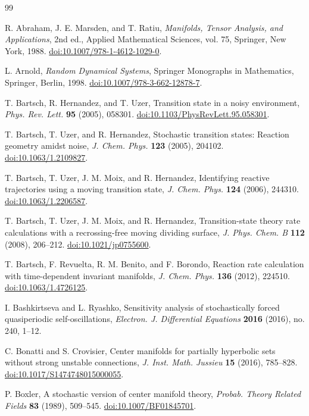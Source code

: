 \documentclass[11pt]{article}
\theoremstyle{definition}
\theoremstyle{remark}
\newcommand{\doi}[1]{\href{https://doi.org/#1}{doi:#1}}
\begin{document}
\begin{thebibliography}{99}

R. Abraham, J. E. Marsden, and T. Ratiu,
\emph{Manifolds, Tensor Analysis, and Applications},
2nd ed., Applied Mathematical Sciences, vol. 75, Springer, New York, 1988.
\doi{10.1007/978-1-4612-1029-0}.

L. Arnold,
\emph{Random Dynamical Systems},
Springer Monographs in Mathematics, Springer, Berlin, 1998.
\doi{10.1007/978-3-662-12878-7}.

T. Bartsch, R. Hernandez, and T. Uzer,
Transition state in a noisy environment,
\emph{Phys. Rev. Lett.} \textbf{95} (2005), 058301.
\doi{10.1103/PhysRevLett.95.058301}.

T. Bartsch, T. Uzer, and R. Hernandez,
Stochastic transition states: Reaction geometry amidst noise,
\emph{J. Chem. Phys.} \textbf{123} (2005), 204102.
\doi{10.1063/1.2109827}.

T. Bartsch, T. Uzer, J. M. Moix, and R. Hernandez,
Identifying reactive trajectories using a moving transition state,
\emph{J. Chem. Phys.} \textbf{124} (2006), 244310.
\doi{10.1063/1.2206587}.

T. Bartsch, T. Uzer, J. M. Moix, and R. Hernandez,
Transition-state theory rate calculations with a recrossing-free moving dividing surface,
\emph{J. Phys. Chem. B} \textbf{112} (2008), 206--212.
\doi{10.1021/jp0755600}.

T. Bartsch, F. Revuelta, R. M. Benito, and F. Borondo,
Reaction rate calculation with time-dependent invariant manifolds,
\emph{J. Chem. Phys.} \textbf{136} (2012), 224510.
\doi{10.1063/1.4726125}.

I. Bashkirtseva and L. Ryashko,
Sensitivity analysis of stochastically forced quasiperiodic self-oscillations,
\emph{Electron. J. Differential Equations} \textbf{2016} (2016), no. 240, 1--12.

C. Bonatti and S. Crovisier,
Center manifolds for partially hyperbolic sets without strong unstable connections,
\emph{J. Inst. Math. Jussieu} \textbf{15} (2016), 785--828.
\doi{10.1017/S1474748015000055}.

P. Boxler,
A stochastic version of center manifold theory,
\emph{Probab. Theory Related Fields} \textbf{83} (1989), 509--545.
\doi{10.1007/BF01845701}.


\end{thebibliography}
\end{document}
